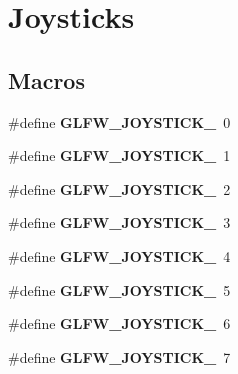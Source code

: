 \hypertarget{group__joysticks}{}\section{Joysticks}
\label{group__joysticks}
\subsection*{Macros}
\begin{DoxyCompactItemize}
\item 
\mbox{\label{group__joysticks_ga34a0443d059e9f22272cd4669073f73d}} 
\#define {\bfseries G\+L\+F\+W\+\_\+\+J\+O\+Y\+S\+T\+I\+C\+K\+\_}~0
\item 
\mbox{\label{group__joysticks_ga6eab65ec88e65e0850ef8413504cb50c}} 
\#define {\bfseries G\+L\+F\+W\+\_\+\+J\+O\+Y\+S\+T\+I\+C\+K\+\_}~1
\item 
\mbox{\label{group__joysticks_gae6f3eedfeb42424c2f5e3161efb0b654}} 
\#define {\bfseries G\+L\+F\+W\+\_\+\+J\+O\+Y\+S\+T\+I\+C\+K\+\_}~2
\item 
\mbox{\label{group__joysticks_ga97ddbcad02b7f48d74fad4ddb08fff59}} 
\#define {\bfseries G\+L\+F\+W\+\_\+\+J\+O\+Y\+S\+T\+I\+C\+K\+\_}~3
\item 
\mbox{\label{group__joysticks_gae43281bc66d3fa5089fb50c3e7a28695}} 
\#define {\bfseries G\+L\+F\+W\+\_\+\+J\+O\+Y\+S\+T\+I\+C\+K\+\_}~4
\item 
\mbox{\label{group__joysticks_ga74771620aa53bd68a487186dea66fd77}} 
\#define {\bfseries G\+L\+F\+W\+\_\+\+J\+O\+Y\+S\+T\+I\+C\+K\+\_}~5
\item 
\mbox{\label{group__joysticks_ga20a9f4f3aaefed9ea5e66072fc588b87}} 
\#define {\bfseries G\+L\+F\+W\+\_\+\+J\+O\+Y\+S\+T\+I\+C\+K\+\_}~6
\item 
\mbox{\label{group__joysticks_ga21a934c940bcf25db0e4c8fe9b364bdb}} 
\#define {\bfseries G\+L\+F\+W\+\_\+\+J\+O\+Y\+S\+T\+I\+C\+K\+\_}~7
\item 
\mbox{\label{group__joysticks_ga87689d47df0ba6f9f5fcbbcaf7b3cecf}} 

\end{DoxyCompactItemize}
